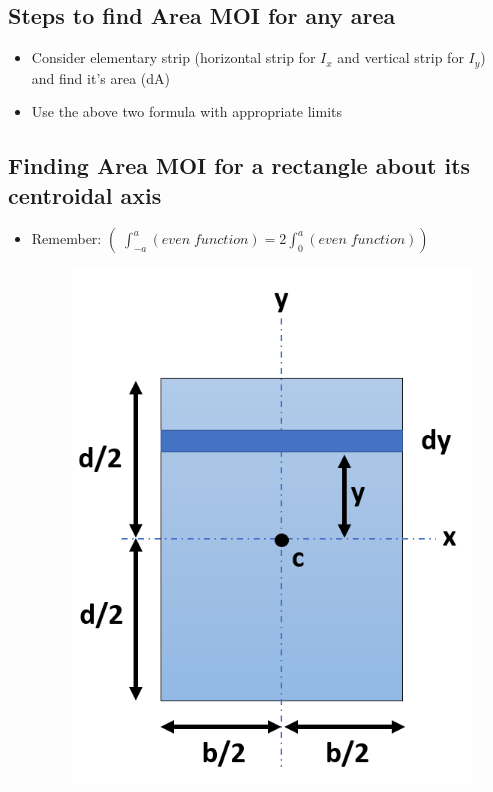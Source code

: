 \documentclass[8pt]{report}
\begin{document}
	\subsection{Steps to find Area MOI for any area}
		\begin{itemize}
			\item Consider elementary strip (horizontal strip for $I_x$ and vertical strip for $I_y$) and find it's area (dA)
			\item Use the above two formula with appropriate limits
		\end{itemize}
	\subsection{Finding Area MOI for a rectangle about its centroidal axis}
		\begin{itemize}
			\item Remember: $(\;\int_{-a}^a(even\;function) = 2\int_0^a(even\;function))$
			\begin{figure}[H]
				\centering
				\includegraphics[scale=0.35]{rectangleMOI_Ix.png}\hspace{3cm}

\end{figure}
\end{itemize}
\end{document}
